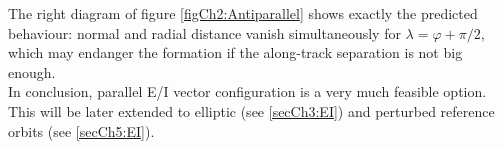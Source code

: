 			\FloatBarrier
			\indent The right diagram of figure \ref{figCh2:Antiparallel} shows exactly the predicted behaviour: normal and radial distance vanish simultaneously for $\lambda = \varphi + \pi/2$, which may endanger the formation if the along-track separation is not big enough.\\
			\indent In conclusion, parallel E/I vector configuration is a very much feasible option. This will be later extended to elliptic (see \ref{secCh3:EI}) and perturbed reference orbits (see \ref{secCh5:EI}).
